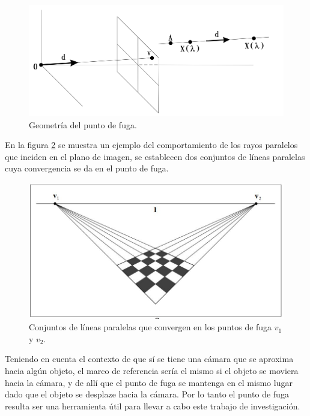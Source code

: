  \begin{figure}[h]
\centering
\includegraphics[scale=0.5]{GraficosEdArt/Figura_8-14_Harley.png}
\caption{Geometría del punto de fuga.}
\label{fig:vanishinPointGeo}
\end{figure}  


En la figura \ref{fig:paralelasPuntoFuga} se muestra un ejemplo del comportamiento de los rayos paralelos que inciden en el plano de imagen, se establecen dos conjuntos de líneas paralelas cuya convergencia se da en el punto de fuga.

 \begin{figure}[h]
\centering
\includegraphics[scale=0.5]{GraficosEdArt/vanishinpointlines.JPG}
\caption{Conjuntos de líneas paralelas que convergen en los puntos de fuga $v_1$ y $v_2$.\citet{hartley_zisserman_2004}}
\label{fig:paralelasPuntoFuga}
\end{figure}  

Teniendo en cuenta el contexto de que sí se tiene una cámara que se aproxima hacia algún objeto, el marco de referencia sería el mismo si el objeto se moviera hacia la cámara, y de allí que el punto de fuga se mantenga en el mismo lugar dado que el objeto se desplaze hacia la cámara. Por lo tanto el punto de fuga resulta ser una herramienta útil para llevar a cabo este trabajo de investigación. 

